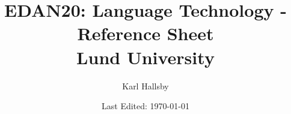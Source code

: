




\begin{titlepage}
  \title{EDAN20: Language Technology - Reference Sheet \\ Lund University}
  \author{Karl Hallsby}
  \date{Last Edited: \today} %
\end{titlepage}


\maketitle
{} %
\tableofcontents
\clearpage
{} %

\appendix
{}

\clearpage


\clearpage



